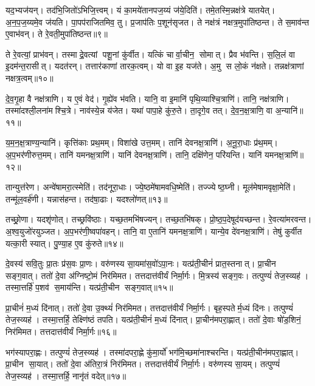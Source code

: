 यद॒भ्यज॑यन्।
तद॑भि॒जितो॑ऽभिजि॒त्त्वम्।
यं का॒मये॑तानपज॒य्यं ज॑ये॒दिति॑।
तमे॒तस्मि॒न्नक्ष॑त्रे यातयेत्।
अ॒न॒प॒ज॒य्यमे॒व ज॑यति।
पा॒पप॑राजितमिव॒ तु।
प्र॒जाप॑तिः प॒शून॑सृजत।
ते नक्ष॑त्रं नक्षत्र॒मुपा॑तिष्ठन्त।
ते स॒माव॑न्त ए॒वाभ॑वन्।
ते रे॒वती॒मुपा॑तिष्ठन्त॥९॥

ते रे॒वत्यां॒ प्राभ॑वन्।
तस्माद्रे॒वत्यां पशू॒नां कु॑र्वीत।
यत्किं चार्वा॒चीन॒ सोमात्।
प्रैव भ॑वन्ति।
स॒लि॒लं वा इ॒दम॑न्त॒रासीत्।
यदत॑रन्।
तत्तार॑काणां तारक॒त्वम्।
यो वा इ॒ह यज॑ते।
अ॒मु स लो॒कं न॑क्षते।
तन्नक्ष॑त्राणां नक्षत्र॒त्वम्॥१०॥

दे॒व॒गृ॒हा वै नक्ष॑त्राणि।
य ए॒वं वेद॑।
गृ॒ह्ये॑व भ॑वति।
यानि॒ वा इ॒मानि॑ पृथि॒व्याश्चि॒त्राणि॑।
तानि॒ नक्ष॑त्राणि।
तस्मा॑दश्ली॒लना॑मश्चि॒त्रे।
नाव॑स्ये॒न्न य॑जेत।
यथा॑ पापा॒हे कु॑रु॒ते।
ता॒दृगे॒व तत्।
दे॒व॒न॒क्ष॒त्राणि॒ वा अ॒न्यानि॑॥११॥

य॒म॒न॒क्ष॒त्राण्य॒न्यानि॑।
कृत्ति॑काः प्रथ॒मम्।
विशा॑खे उत्त॒मम्।
तानि॑ देवनक्ष॒त्राणि॑।
अ॒नू॒रा॒धाः प्र॑थ॒मम्।
अ॒प॒भर॑णीरुत्त॒मम्।
तानि॑ यमनक्ष॒त्राणि॑।
यानि॑ देवनक्ष॒त्राणि॑।
तानि॒ दक्षि॑णेन॒ परि॑यन्ति।
यानि॑ यमनक्ष॒त्राणि॑॥१२॥

तान्युत्त॑रेण।
अन्वे॑षामरा॒त्स्मेति॑।
तद॑नूरा॒धाः।
ज्ये॒ष्ठमे॑षाम\-वधि॒ष्मेति॑।
तज्ज्येष्ठ॒घ्नी।
मूल॑मेषामवृक्षा॒मेति॑।
तन्मू॑ल॒वर्\mbox{}ह॑णी।
यन्नास॑हन्त।
तद॑षा॒ढाः।
यदश्लो॑णत्॥१३॥

तच्छ्रो॒णा।
यदशृ॑णोत्।
तच्छ्रवि॑ष्ठाः।
यच्छ॒तमभि॑षज्यन्।
तच्छ॒तभि॑षक्।
प्रो॒ष्ठ॒प॒देषूद॑यच्छन्त।
रे॒वत्या॑मरवन्त।
अ॒श्व॒युजो॑रयुञ्जत।
अ॒प॒भर॑णी॒ष्वपा॑वहन्।
तानि॒ वा ए॒तानि॑ यमनक्ष॒त्राणि॑।
यान्ये॒व दे॑वनक्ष॒त्राणि॑।
तेषु॑ कुर्वीत यत्का॒री स्यात्।
पु॒ण्या॒ह ए॒व कु॑रुते॥१४॥

दे॒वस्य॑ सवि॒तुः प्रा॒तः प्र॑स॒वः प्रा॒णः।
वरु॑णस्य सा॒यमा॑स॒वो॑ऽपा॒नः।
यत्प्र॑ती॒चीनं॑ प्रात॒स्तनात्।
प्रा॒चीन सङ्ग॒वात्।
ततो॑ दे॒वा अ॑ग्निष्टो॒मं निर॑मिमत।
तत्तदात्त॑वीर्यं निर्मा॒र्गः।
मि॒त्रस्य॑ सङ्ग॒वः।
तत्पुण्यं॑ तेज॒स्व्यह॑।
तस्मा॒त्तर्\mbox{}हि॑ प॒शव॑ स॒माय॑न्ति।
यत्प्र॑ती॒चीन सङ्ग॒वात्॥१५॥

प्रा॒चीनं॑ म॒ध्यं दि॑नात्।
ततो॑ दे॒वा उ॒क्थ्यं॑ निर॑मिमत।
तत्तदात्त॑वीर्यं निर्मा॒र्गः।
बृह॒स्पतेर्म॒ध्यं दि॑नः।
तत्पुण्यं॑ तेज॒स्व्यह॑।
तस्मा॒त्तर्\mbox{}हि॒ तेक्ष्णि॑ष्ठं तपति।
यत्प्र॑ती॒चीनं॑ म॒ध्यं दि॑नात्।
प्रा॒चीन॑मपरा॒ह्णात्।
ततो॑ दे॒वाः षो॑ड॒शिनं॒ निर॑मिमत।
तत्तदात्त॑वीर्यं निर्मा॒र्गः॥१६॥

भग॑स्यापरा॒ह्णः।
तत्पुण्यं॑ तेज॒स्व्यह॑।
तस्मा॑दपरा॒ह्णे कु॑मा॒र्यो॑ भग॑मि॒च्छमा॑नाश्चरन्ति।
यत्प्र॑ती॒चीन॑मपरा॒ह्णात्।
प्रा॒चीन सा॒यात्।
ततो॑ दे॒वा अ॑तिरा॒त्रं निर॑मिमत।
तत्तदात्त॑वीर्यं निर्मा॒र्गः।
वरु॑णस्य सा॒यम्।
तत्पुण्यं॑ तेज॒स्व्यह॑।
तस्मा॒त्तर्\mbox{}हि॒ नानृ॑तं वदेत्॥१७॥

